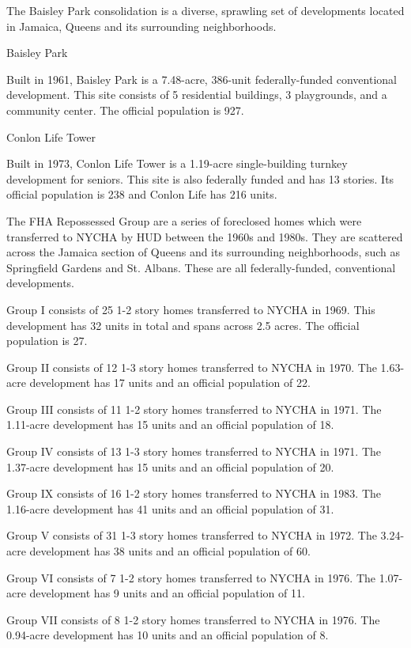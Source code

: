 

The Baisley Park consolidation is a diverse, sprawling set of developments located in Jamaica, Queens and its surrounding neighborhoods. 

Baisley Park 

Built in 1961, Baisley Park is a 7.48-acre, 386-unit federally-funded conventional development. This site consists of 5 residential buildings, 3 playgrounds, and a community center. The official population is 927. 

Conlon Life Tower 

Built in 1973, Conlon Life Tower is a 1.19-acre single-building turnkey development for seniors. This site is also federally funded and has 13 stories. Its official population is 238 and Conlon Life has 216 units. 

The FHA Repossessed Group are a series of foreclosed homes which were transferred to NYCHA by HUD between the 1960s and 1980s. They are scattered across the Jamaica section of Queens and its surrounding neighborhoods, such as Springfield Gardens and St. Albans. These are all federally-funded, conventional developments. 

Group I consists of 25 1-2 story homes transferred to NYCHA in 1969. This development has 32 units in total and spans across 2.5 acres. The official population is 27. 

Group II consists of 12 1-3 story homes transferred to NYCHA in 1970. The 1.63-acre development has 17 units and an official population of 22. 

Group III consists of 11 1-2 story homes transferred to NYCHA in 1971. The 1.11-acre development has 15 units and an official population of 18. 

Group IV consists of 13 1-3 story homes transferred to NYCHA in 1971. The 1.37-acre development has 15 units and an official population of 20. 

Group IX consists of 16 1-2 {\textonehalf} story homes transferred to NYCHA in 1983. The 1.16-acre development has 41 units and an official population of 31. 

Group V consists of 31 1-3 story homes transferred to NYCHA in 1972. The 3.24-acre development has 38 units and an official population of 60. 

Group VI consists of 7 1-2 {\textonehalf} story homes transferred to NYCHA in 1976. The 1.07-acre development has 9 units and an official population of 11. 

Group VII consists of 8 1-2 {\textonehalf} story homes transferred to NYCHA in 1976. The 0.94-acre development has 10 units and an official population of 8.


